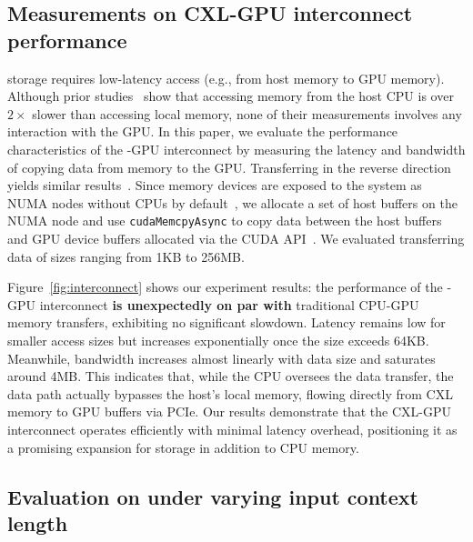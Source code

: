 \subsection{Measurements on CXL-GPU interconnect performance}
\label{sec:eval:connect}

\kvcache storage requires low-latency access (e.g., from host memory to GPU memory). 
Although prior studies~\cite{cxl1, cxl2} show that accessing \cxl memory from the host CPU is over $2\times$ slower than accessing local memory, none of their measurements involves any interaction with the GPU. 
In this paper, we evaluate the performance characteristics of the \cxl-GPU interconnect by measuring the latency and bandwidth of copying data from \cxl memory to the GPU. Transferring in the reverse direction yields similar results~\cite{pcie}.
Since \cxl memory devices are exposed to the system as NUMA nodes without CPUs by default~\cite{cxl2}, we allocate a set of host buffers on the \cxl NUMA node and use \texttt{cudaMemcpyAsync} to copy data between the host buffers and GPU device buffers allocated via the CUDA API~\cite{cudaapi}. 
We evaluated transferring data of sizes ranging from 1KB to 256MB.

Figure~\ref{fig:interconnect} shows our experiment results: the performance of the \cxl-GPU interconnect \textbf{is unexpectedly on par with} traditional CPU-GPU memory transfers, exhibiting no significant slowdown. 
Latency remains low for smaller access sizes but increases exponentially once the size exceeds 64KB. 
Meanwhile, bandwidth increases almost linearly with data size and saturates around 4MB. 
This indicates that, while the CPU oversees the data transfer, the data path actually bypasses the host's local memory, flowing directly from CXL memory to GPU buffers via PCIe.
Our results demonstrate that the CXL-GPU interconnect operates efficiently with minimal latency overhead, positioning it as a promising expansion for \kvcache storage in addition to CPU memory.

\subsection{Evaluation on \ttft under varying input context length}
\label{sec:eval:ttft}

